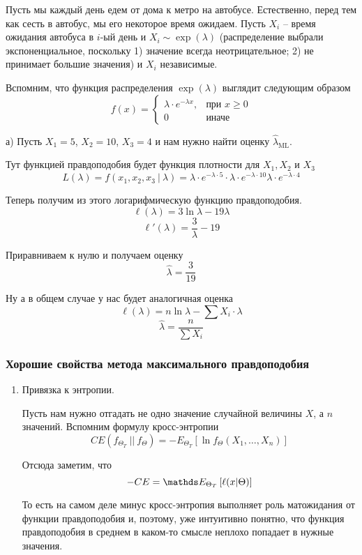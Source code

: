 \documentclass{article}
\begin{document}
\begin{example}
    Пусть мы каждый день едем от дома к метро на автобусе. Естественно, перед тем как сесть в автобус, мы его некоторое время ожидаем. Пусть $X_i$ -- время ожидания автобуса в $i$-ый день и $X_i \sim \exp(\lambda)$ (распределение выбрали экспоненциальное, поскольку 1) значение всегда неотрицательное; 2) не принимает большие значения) и $X_i$ независимые.

    Вспомним, что функция распределения $\exp(\lambda)$ выглядит следующим образом
    \[
        f(x) = 
        \begin{cases}
            \lambda \cdot e^{-\lambda x}, & \text{при $x \geqslant 0$} \\
            0 & \text{иначе}
        \end{cases}  
    \]

    а) Пусть $X_1 = 5$, $X_2 = 10$, $X_3 = 4$ и нам нужно найти оценку $\hat\lambda_{\text{ML}}$.

    Тут функцией правдоподобия будет функция плотности для $X_1, X_2$ и $X_3$
    \[
        L(\lambda) = f(x_1, x_2, x_3\ |\ \lambda) = \lambda \cdot e^{-\lambda \cdot 5} \cdot \lambda \cdot e^{-\lambda \cdot 10} \lambda \cdot e^{-\lambda \cdot 4}
    \]

    Теперь получим из этого логарифмическую функцию правдоподобия.
    \[
        \ell(\lambda) = 3\ln \lambda - 19\lambda
    \]
    \[
        \ell'(\lambda) = \frac3\lambda - 19
    \]

    Приравниваем к нулю и получаем оценку
    \[
        \hat\lambda = \frac3{19}  
    \]

    Ну а в общем случае у нас будет аналогичная оценка
    \[
        \ell(\lambda) = n\ln \lambda - \sum X_i \cdot \lambda  
    \]
    \[
        \hat \lambda = \frac{n}{\sum X_i}  
    \]
\end{example}

\subsubsection{Хорошие свойства метода максимального правдоподобия}

\begin{enumerate}
    \item Привязка к энтропии.
    
    Пусть нам нужно отгадать не одно значение случайной величины $X$, а $n$ значений. Вспомним формулу кросс-энтропии
    \[
        CE(f_{\Theta_{T}}\ ||\ f_{\Theta}) = -E_{\Theta_T} \left[ \ln f_{\Theta} (X_1, \ldots, X_n) \right]  
    \]

    Отсюда заметим, что
    \[
        -CE = \E_{\Theta_T} \left[ \ell(x | \Theta) \right]
    \]

    То есть на самом деле минус кросс-энтропия выполняет роль матожидания от функции правдоподобия и, поэтому, уже интуитивно понятно, что функция правдоподобия в среднем в каком-то смысле неплохо попадает в нужные значения.
\end{enumerate}
\end{document}
